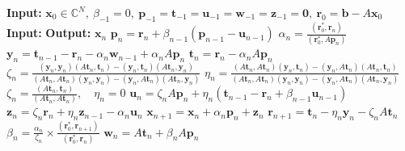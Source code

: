 \begin{algorithm}[H]\caption{}\label{alg:gpbicg}\begin{algorithmic}[1]
\Statex\textbf{Input:} $\bm x_0\in\mathbb C^N,\ \beta_{-1}=0,\ \bm p_{-1}=\bm t_{-1}=\bm u_{-1}=\bm w_{-1}=\bm z_{-1}=\bm0,\ \bm r_0=\bm b-A\bm x_0$
\Statex\textbf{Input:} 
\Statex\textbf{Output:} $\bm x_n$
\State $\bm p_n=\bm r_n+\beta_{n-1}(\bm p_{n-1}-\bm u_{n-1})$
\State $\alpha_n=\frac{(\bm r_0^{*},\bm r_n)}{(\bm r_0^{*},A\bm p_n)}$
\State $\bm y_n=\bm t_{n-1}-\bm r_n-\alpha_n\bm w_{n-1}+\alpha_nA\bm p_n$
\State $\bm t_n=\bm r_n-\alpha_nA\bm p_n$
\State $\zeta_n=\frac{(\bm y_n,\bm y_n)(A\bm t_n,\bm t_n)-(\bm y_n,\bm t_n)(A\bm t_n,\bm y_n)}{(A\bm t_n,A\bm t_n)(\bm y_n,\bm y_n)-(\bm y_n,A\bm t_n)(A\bm t_n,\bm y_n)}$
\State $\eta_n=\frac{(A\bm t_n,A\bm t_n)(\bm y_n,\bm t_n)-(\bm y_n,A\bm t_n)(A\bm t_n,\bm t_n)}{(A\bm t_n,A\bm t_n)(\bm y_n,\bm y_n)-(\bm y_n,A\bm t_n)(A\bm t_n,\bm y_n)}$
\State $\zeta_n=\frac{(A\bm t_n,\bm t_n)}{(A\bm t_n,A\bm t_n)},\quad\eta_n=0$
\EndIf
\State $\bm u_n=\zeta_nA\bm p_n+\eta_n(\bm t_{n-1}-\bm r_n+\beta_{n-1}\bm u_{n-1})$
\State $\bm z_n=\zeta_n\bm r_n+\eta_n\bm z_{n-1}-\alpha_n\bm u_n$
\State $\bm x_{n+1}=\bm x_n+\alpha_n\bm p_n+\bm z_n$
\State $\bm r_{n+1}=\bm t_n-\eta_n\bm y_n-\zeta_nA\bm t_n$
\State $\beta_n=\frac{\alpha_n}{\zeta_n}\times\frac{(\bm r_0^{*},\bm r_{n+1})}{(\bm r_0^{*},\bm r_n)}$
\State $\bm w_n=A\bm t_n+\beta_nA\bm p_n$
\EndFor\end{algorithmic}\end{algorithm}
